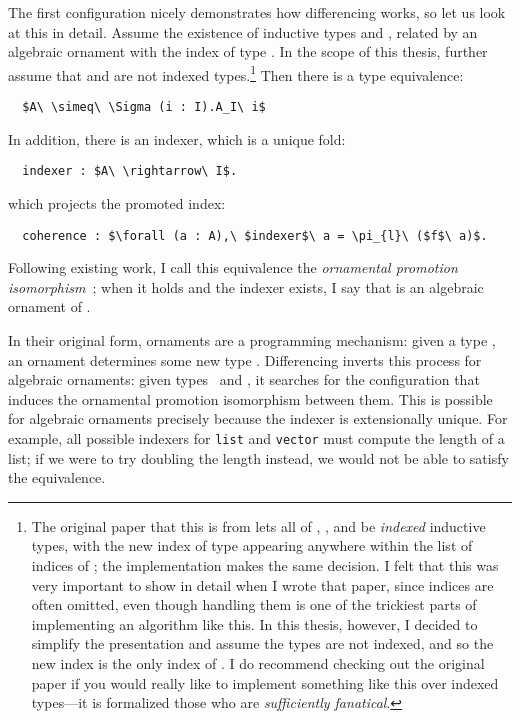 The first configuration nicely demonstrates how differencing works, so let us look at this in detail.
Assume the existence of inductive types \Aa and \AI, related by an algebraic ornament with the index of type \I.
In the scope of this thesis, further assume that \Aa and \I are not indexed types.\footnote{The original paper that this is from lets all of \Aa,
\AI, and \I be \textit{indexed} inductive types, with the new index of type \I appearing anywhere within the list of indices of \AI;
the implementation makes the same decision.
I felt that this was very important to show in detail when I wrote that paper, since indices are often omitted,
even though handling them is one of the trickiest parts of implementing an algorithm like this.
In this thesis, however, I decided to simplify the presentation and assume the types are not indexed,
and so the new index is the only index of \AI.
I do recommend checking out the original paper if you would really like to implement something like this over indexed types---it is formalized
those who are \textit{sufficiently fanatical}.}
Then there is a type equivalence:

\begin{lstlisting}
  $A\ \simeq\ \Sigma (i : I).A_I\ i$
\end{lstlisting}
In addition, there is an indexer, which is a unique fold:

\begin{lstlisting}
  indexer : $A\ \rightarrow\ I$.
\end{lstlisting}
which projects the promoted index:
\begin{lstlisting}
  coherence : $\forall (a : A),\ $indexer$\ a = \pi_{l}\ ($f$\ a)$.
\end{lstlisting}
Following existing work, I call this equivalence the \textit{ornamental promotion isomorphism}~\cite{ko2016programming}; 
when it holds and the indexer exists, I say that \AI is an algebraic ornament of \Aa.

In their original form, ornaments are a programming mechanism: given a type \Aa, an ornament determines
some new type \AI. Differencing inverts this process for algebraic ornaments: given types \Aa\ and \AI, 
it searches for the configuration that induces the ornamental promotion isomorphism between them.
This is possible for algebraic ornaments precisely because the indexer is extensionally unique.
For example, all possible indexers for \lstinline{list} and \lstinline{vector} must compute
the length of a list; if we were to try doubling the length instead, we would not be able to satisfy the equivalence.

